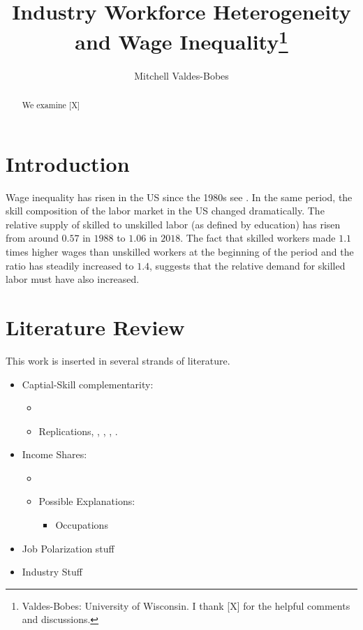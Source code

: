 \documentclass[12pt]{article}
\begin{document}
\sloppy
\title{Industry Workforce Heterogeneity and Wage Inequality\thanks{Valdes-Bobes: University of Wisconsin.
 I thank [X] for the helpful comments and discussions.}}
\author{Mitchell Valdes-Bobes}
\maketitle
\begin{abstract}
 We examine [X]
\end{abstract}
\thispagestyle{empty}

\pagebreak{}

\section{Introduction}\label{sec:introduction}
Wage inequality has risen in the US since the 1980s see \citet{acemoglu2011skills}. In the same period, the skill composition of the labor market in the US changed dramatically. The relative supply of skilled to unskilled labor (as defined by education) has risen from around $0.57$ in $1988$ to $1.06$ in $2018$. The fact that skilled workers made $1.1$ times higher wages than unskilled workers at the beginning of the period and the ratio has steadily increased to $1.4$, suggests that the relative demand for skilled labor must have also increased.




\section{Literature Review}\label{sec:literature_review}
This work is inserted in several strands of literature.
\begin{itemize}
 \item Captial-Skill complementarity:
 \begin{itemize}
 \item \citet{krusell2000capital}
 \item Replications, \citet{ohanian2021revisiting}, \citet{polgreen2008capital}, \citet{maliar2020capital}, \citet{castex2022decline}.
 \end{itemize}
 \item Income Shares:
 \begin{itemize}
 \item \citet{karabarbounis2014global}
 \item Possible Explanations:
 \begin{itemize}
 \item Occupations \citet{orak2017capital}
 \end{itemize}
 \end{itemize}
 \item Job Polarization stuff \citet{song2019firming}
 \item Industry Stuff \citet{haltiwanger2022industries}
\end{itemize}
\end{document}
